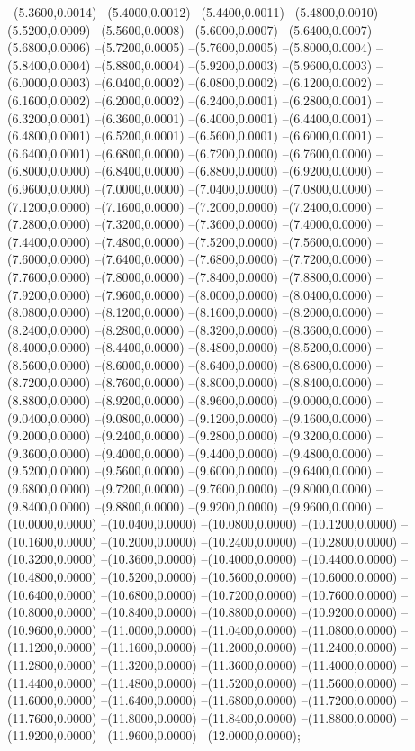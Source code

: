 {	--(5.3600,0.0014)
	--(5.4000,0.0012)
	--(5.4400,0.0011)
	--(5.4800,0.0010)
	--(5.5200,0.0009)
	--(5.5600,0.0008)
	--(5.6000,0.0007)
	--(5.6400,0.0007)
	--(5.6800,0.0006)
	--(5.7200,0.0005)
	--(5.7600,0.0005)
	--(5.8000,0.0004)
	--(5.8400,0.0004)
	--(5.8800,0.0004)
	--(5.9200,0.0003)
	--(5.9600,0.0003)
	--(6.0000,0.0003)
	--(6.0400,0.0002)
	--(6.0800,0.0002)
	--(6.1200,0.0002)
	--(6.1600,0.0002)
	--(6.2000,0.0002)
	--(6.2400,0.0001)
	--(6.2800,0.0001)
	--(6.3200,0.0001)
	--(6.3600,0.0001)
	--(6.4000,0.0001)
	--(6.4400,0.0001)
	--(6.4800,0.0001)
	--(6.5200,0.0001)
	--(6.5600,0.0001)
	--(6.6000,0.0001)
	--(6.6400,0.0001)
	--(6.6800,0.0000)
	--(6.7200,0.0000)
	--(6.7600,0.0000)
	--(6.8000,0.0000)
	--(6.8400,0.0000)
	--(6.8800,0.0000)
	--(6.9200,0.0000)
	--(6.9600,0.0000)
	--(7.0000,0.0000)
	--(7.0400,0.0000)
	--(7.0800,0.0000)
	--(7.1200,0.0000)
	--(7.1600,0.0000)
	--(7.2000,0.0000)
	--(7.2400,0.0000)
	--(7.2800,0.0000)
	--(7.3200,0.0000)
	--(7.3600,0.0000)
	--(7.4000,0.0000)
	--(7.4400,0.0000)
	--(7.4800,0.0000)
	--(7.5200,0.0000)
	--(7.5600,0.0000)
	--(7.6000,0.0000)
	--(7.6400,0.0000)
	--(7.6800,0.0000)
	--(7.7200,0.0000)
	--(7.7600,0.0000)
	--(7.8000,0.0000)
	--(7.8400,0.0000)
	--(7.8800,0.0000)
	--(7.9200,0.0000)
	--(7.9600,0.0000)
	--(8.0000,0.0000)
	--(8.0400,0.0000)
	--(8.0800,0.0000)
	--(8.1200,0.0000)
	--(8.1600,0.0000)
	--(8.2000,0.0000)
	--(8.2400,0.0000)
	--(8.2800,0.0000)
	--(8.3200,0.0000)
	--(8.3600,0.0000)
	--(8.4000,0.0000)
	--(8.4400,0.0000)
	--(8.4800,0.0000)
	--(8.5200,0.0000)
	--(8.5600,0.0000)
	--(8.6000,0.0000)
	--(8.6400,0.0000)
	--(8.6800,0.0000)
	--(8.7200,0.0000)
	--(8.7600,0.0000)
	--(8.8000,0.0000)
	--(8.8400,0.0000)
	--(8.8800,0.0000)
	--(8.9200,0.0000)
	--(8.9600,0.0000)
	--(9.0000,0.0000)
	--(9.0400,0.0000)
	--(9.0800,0.0000)
	--(9.1200,0.0000)
	--(9.1600,0.0000)
	--(9.2000,0.0000)
	--(9.2400,0.0000)
	--(9.2800,0.0000)
	--(9.3200,0.0000)
	--(9.3600,0.0000)
	--(9.4000,0.0000)
	--(9.4400,0.0000)
	--(9.4800,0.0000)
	--(9.5200,0.0000)
	--(9.5600,0.0000)
	--(9.6000,0.0000)
	--(9.6400,0.0000)
	--(9.6800,0.0000)
	--(9.7200,0.0000)
	--(9.7600,0.0000)
	--(9.8000,0.0000)
	--(9.8400,0.0000)
	--(9.8800,0.0000)
	--(9.9200,0.0000)
	--(9.9600,0.0000)
	--(10.0000,0.0000)
	--(10.0400,0.0000)
	--(10.0800,0.0000)
	--(10.1200,0.0000)
	--(10.1600,0.0000)
	--(10.2000,0.0000)
	--(10.2400,0.0000)
	--(10.2800,0.0000)
	--(10.3200,0.0000)
	--(10.3600,0.0000)
	--(10.4000,0.0000)
	--(10.4400,0.0000)
	--(10.4800,0.0000)
	--(10.5200,0.0000)
	--(10.5600,0.0000)
	--(10.6000,0.0000)
	--(10.6400,0.0000)
	--(10.6800,0.0000)
	--(10.7200,0.0000)
	--(10.7600,0.0000)
	--(10.8000,0.0000)
	--(10.8400,0.0000)
	--(10.8800,0.0000)
	--(10.9200,0.0000)
	--(10.9600,0.0000)
	--(11.0000,0.0000)
	--(11.0400,0.0000)
	--(11.0800,0.0000)
	--(11.1200,0.0000)
	--(11.1600,0.0000)
	--(11.2000,0.0000)
	--(11.2400,0.0000)
	--(11.2800,0.0000)
	--(11.3200,0.0000)
	--(11.3600,0.0000)
	--(11.4000,0.0000)
	--(11.4400,0.0000)
	--(11.4800,0.0000)
	--(11.5200,0.0000)
	--(11.5600,0.0000)
	--(11.6000,0.0000)
	--(11.6400,0.0000)
	--(11.6800,0.0000)
	--(11.7200,0.0000)
	--(11.7600,0.0000)
	--(11.8000,0.0000)
	--(11.8400,0.0000)
	--(11.8800,0.0000)
	--(11.9200,0.0000)
	--(11.9600,0.0000)
	--(12.0000,0.0000);
}
